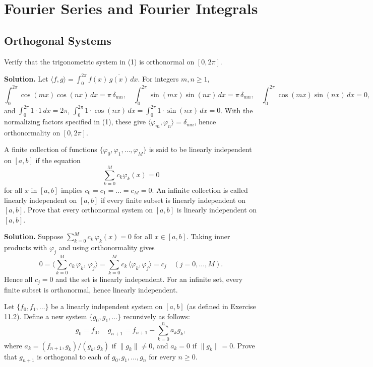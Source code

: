 \chapter{Fourier Series and Fourier Integrals}

\section{Orthogonal Systems}

\begin{problembox}
Verify that the trigonometric system in (1) is orthonormal on $[0, 2\pi]$.
\end{problembox}

\noindent\textbf{Solution.}
Let $\langle f, g\rangle = \int_0^{2\pi} f(x)\,\overline{g(x)}\,dx$. For integers $m, n \ge 1$,
\[
\int_0^{2\pi} \cos(mx)\cos(nx)\,dx = \pi\,\delta_{mn},\quad \int_0^{2\pi} \sin(mx)\sin(nx)\,dx = \pi\,\delta_{mn},\quad \int_0^{2\pi} \cos(mx)\sin(nx)\,dx = 0,
\]
and $\int_0^{2\pi} 1\cdot 1\,dx = 2\pi$, $\int_0^{2\pi} 1\cdot \cos(nx)\,dx = \int_0^{2\pi} 1\cdot \sin(nx)\,dx = 0$. With the normalizing factors specified in (1), these give $\langle \varphi_m, \varphi_n\rangle = \delta_{mn}$, hence orthonormality on $[0,2\pi]$.

\begin{problembox}
A finite collection of functions $\{\varphi_0, \varphi_1, \dots, \varphi_M\}$ is said to be linearly independent on $[a, b]$ if the equation
\[
\sum_{k=0}^M c_k \varphi_k(x) = 0
\]
for all $x$ in $[a, b]$ implies $c_0 = c_1 = \dots = c_M = 0$. An infinite collection is called linearly independent on $[a, b]$ if every finite subset is linearly independent on $[a, b]$. Prove that every orthonormal system on $[a, b]$ is linearly independent on $[a, b]$.
\end{problembox}

\noindent\textbf{Solution.}
Suppose $\sum_{k=0}^M c_k\,\varphi_k(x)=0$ for all $x\in[a,b]$. Taking inner products with $\varphi_j$ and using orthonormality gives
\[
0 = \Big\langle \sum_{k=0}^M c_k\,\varphi_k,\,\varphi_j\Big\rangle = \sum_{k=0}^M c_k\,\langle\varphi_k,\varphi_j\rangle = c_j\quad (j=0,\dots,M).
\]
Hence all $c_j=0$ and the set is linearly independent. For an infinite set, every finite subset is orthonormal, hence linearly independent.

\begin{problembox}
Let $\{f_0, f_1, \dots\}$ be a linearly independent system on $[a, b]$ (as defined in Exercise 11.2). Define a new system $\{g_0, g_1, \dots\}$ recursively as follows:
\[
g_0 = f_0, \quad g_{n+1} = f_{n+1} - \sum_{k=0}^n a_k g_k,
\]
where $a_k = (f_{n+1}, g_k)/(g_k, g_k)$ if $\|g_k\| \neq 0$, and $a_k = 0$ if $\|g_k\| = 0$. Prove that $g_{n+1}$ is orthogonal to each of $g_0, g_1, \dots, g_n$ for every $n \geq 0$.
\end{problembox}

